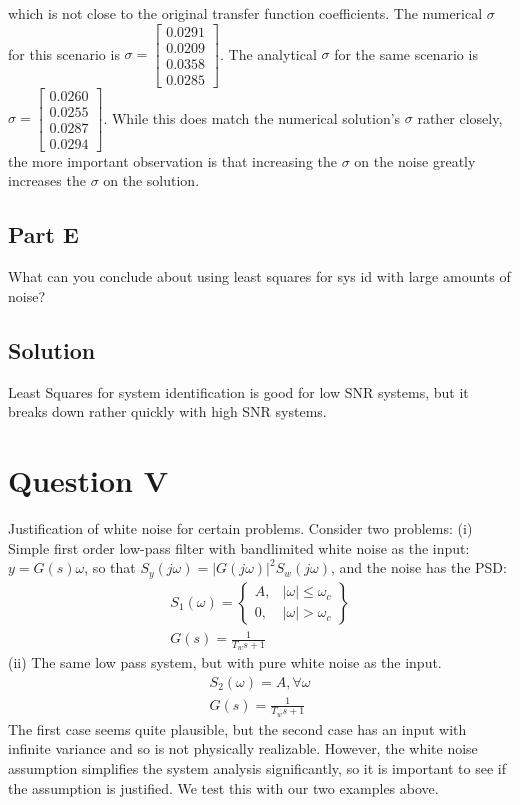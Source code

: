 \documentclass{article}
\begin{document}
which is not close to the original transfer function coefficients.  The numerical $\sigma$ for this scenario is 
$\sigma = \begin{bmatrix} 0.0291 \\ 0.0209 \\ 0.0358 \\ 0.0285 \end{bmatrix}$.  The analytical $\sigma$ for the same scenario is 
$\sigma = \begin{bmatrix} 0.0260 \\ 0.0255 \\ 0.0287 \\ 0.0294 \end{bmatrix}$.  While this does match the numerical solution's $\sigma$ rather closely, the 
more important observation is that increasing the $\sigma$ on the noise greatly increases the $\sigma$ on the solution.

\subsection*{Part E}
What can you conclude about using least squares for sys id with large amounts of noise?
\subsection*{Solution}
Least Squares for system identification is good for low SNR systems, but it breaks down rather quickly with high SNR systems.

\section*{Question V}
Justification of white noise for certain problems. Consider two problems: (i) Simple first order low-pass filter with bandlimited white noise as the input:\\
$y = G(s)\omega$, so that $S_y(j\omega) = |G(j\omega)|^2 S_w(j\omega)$, and the noise has the PSD:
\begin{gather*}
    S_1(\omega) = \left\{
                    \begin{array}{lr}
                        A, & |\omega|\leq\omega_c\\
                        0, & |\omega|>\omega_c
                    \end{array}
                \right\}\\
    G(s)=\frac{1}{T_ws+1}
\end{gather*}
(ii) The same low pass system, but with pure white noise as the input.
\begin{gather*}
    S_2(\omega)=A,\forall\omega\\
    G(s)=\frac{1}{T_ws+1}
\end{gather*}
The first case seems quite plausible, but the second case has an input with infinite variance and so is not physically realizable.  However, the white noise 
assumption simplifies the system analysis significantly, so it is important to see if the assumption is justified.  We test this with our two examples above.
\end{document}
